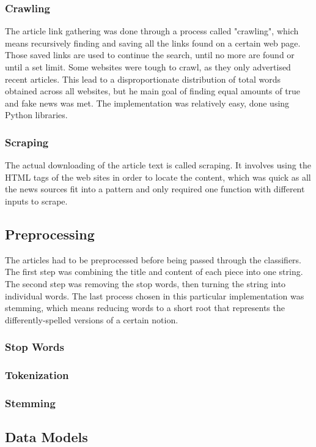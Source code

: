 \documentclass{article}
\begin{document}
	\subsubsection{Crawling}
	The article link gathering was done through a process called "crawling", which means recursively finding and saving all the links found on a certain web page. Those saved links are used to continue the search, until no more are found or until a set limit. Some websites were tough to crawl, as they only advertised recent articles. This lead to a disproportionate distribution of total words obtained across all websites, but he main goal of finding equal amounts of true and fake news was met. The implementation was relatively easy, done using Python libraries.
	\subsubsection{Scraping}
	The actual downloading of the article text is called scraping. It involves using the HTML tags of the web sites in order to locate the content, which was quick as all the news sources fit into a pattern and only required one function with different inputs to scrape.
	
\subsection{Preprocessing}
	The articles had to be preprocessed before being passed through the classifiers. The first step was combining the title and content of each piece into one string. The second step was removing the stop words, then turning the string into individual words. The last process chosen in this particular implementation was stemming, which means reducing words to a short root that represents the differently-spelled versions of a certain notion.
	\subsubsection{Stop Words}
	\subsubsection{Tokenization}
	\subsubsection{Stemming}
	
	\subsection{Data Models}
\end{document}
